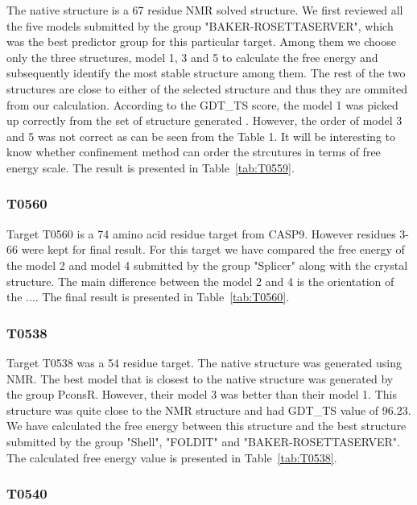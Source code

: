 \documentclass[12pt]{article}
\begin{document}
The native structure is a  67 residue NMR solved structure. We first reviewed all the five models submitted by the group 
"BAKER-ROSETTASERVER", which was the best predictor group for this particular target. 
Among them we choose only the three structures, model 1, 3 and 5 to calculate the free energy and subsequently identify the most stable structure 
among them. The rest of the two structures are 
close to either of the selected structure and thus they are ommited from our calculation. According to the GDT\_TS score, the model 1 was 
picked up correctly from the set of structure generated . However, the order of model 3 and 5 was not 
correct as can be seen from the Table 1. It will be interesting to know whether confinement method can order the strcutures in terms of 
free energy scale. The result is presented in Table~\protect\ref{tab:T0559}.        
  

\subsubsection{T0560}
  
Target T0560 is a 74 amino acid residue target from CASP9. However residues 3-66 were kept for final result.
For this target we have compared the free energy of the model 2 and model 4 submitted by the group "Splicer" along with the crystal structure. 
The main difference between the model 2 and 4 is the orientation of the ....
The final result is presented in Table~\protect\ref{tab:T0560}.

\subsubsection{T0538}

Target T0538 was a 54 residue target. The native structure was generated using NMR. The best model that is closest to the native structure was
generated by the group PconsR. However, their model 3 was better than their model 1. This structure was quite close to the NMR structure and 
had GDT\_TS value of 96.23. We have calculated the free energy between this structure and the best structure submitted by the group "Shell",
"FOLDIT" and "BAKER-ROSETTASERVER". The calculated free energy value is presented in Table~\protect\ref{tab:T0538}.

\subsubsection{T0540}
\end{document}
